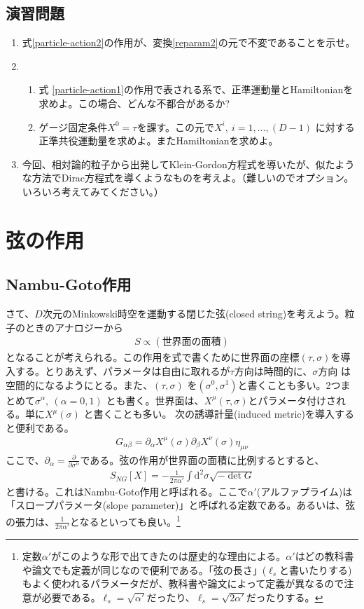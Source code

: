\documentclass[report,paper=a4, fontsize=12pt, line_length=16cm, number_of_lines=33,dvipdfmx]{jlreq}
\numberwithin{equation}{chapter}
\numberwithin{equation}{section}
\newcommand{\del}{\partial}
\newcommand{\di}{\mathrm{d}}
\begin{document}
\subsection*{演習問題}
\begin{enumerate}
 \item 式\eqref{particle-action2}の作用が、変換\eqref{reparam2}の元で不変であることを示せ。
 \item
\begin{enumerate}
 \item 式 \eqref{particle-action1}の作用で表される系で、正準運動量とHamiltonianを求めよ。この場合、どんな不都合があるか?
 \item ゲージ固定条件$X^{0}=\tau$を課す。この元で$X^{i},\ i=1,\dots,(D-1)$ に対する正準共役運動量を求めよ。またHamiltonianを求めよ。
\end{enumerate}  
 \item 今回、相対論的粒子から出発してKlein-Gordon方程式を導いたが、似たような方法でDirac方程式を導くようなものを考えよ。（難しいのでオプション。いろいろ考えてみてください。）
\end{enumerate}
\section{弦の作用}
\subsection{Nambu-Goto作用}
さて、$D$次元のMinkowski時空を運動する閉じた弦(closed string)を考えよう。粒子のときのアナロジーから
\begin{align}
 S \propto (\text{世界面の面積})
\end{align}
となることが考えられる。この作用を式で書くために世界面の座標$(\tau,\sigma)$を導入する。とりあえず、パラメータは自由に取れるが$\tau$方向は時間的に、$\sigma$方向 は空間的になるようにとる。また、$(\tau,\sigma)$ を$(\sigma^0,\sigma^1)$と書くことも多い。2つまとめて$\sigma^{\alpha},\ (\alpha=0,1)$ とも書く。世界面は、$X^{\mu}(\tau,\sigma)$とパラメータ付けされる。単に$X^{\mu}(\sigma)$ と書くことも多い。
次の誘導計量(induced metric)を導入すると便利である。
\begin{align} G_{\alpha\beta}=\del_{\alpha}X^{\mu}(\sigma)\del_{\beta}X^{\nu}(\sigma)\eta_{\mu\nu}
\end{align}
ここで、$\del_{\alpha}=\frac{\del}{\del\sigma^{\alpha}}$である。弦の作用が世界面の面積に比例するとすると、
\begin{align}
 S_{NG}[X]=-\frac{1}{2\pi\alpha'}\int \di^2\sigma
\sqrt{-\det G}\label{NG}
\end{align}
と書ける。これはNambu-Goto作用と呼ばれる。ここで$\alpha'$(アルファプライム)は「スロープパラメータ(slope parameter)」と呼ばれる定数である。あるいは、弦の張力は、$\frac{1}{2\pi\alpha'}$となるといっても良い。\footnote{定数$\alpha'$がこのような形で出てきたのは歴史的な理由による。$\alpha'$はどの教科書や論文でも定義が同じなので便利である。「弦の長さ」($\ell_s$と書いたりする)もよく使われるパラメータだが、教科書や論文によって定義が異なるので注意が必要である。$\ell_s=\sqrt{\alpha'}$だったり、$\ell_s=\sqrt{2\alpha'}$だったりする。
}
\end{document}
